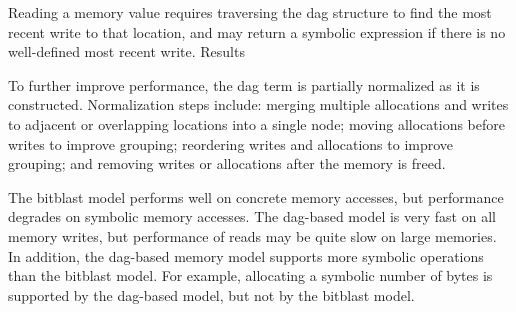 \documentclass{article}
\begin{document}
\begin{itemize}
\begin{itemize}
          \end{itemize}
          Reading a memory value requires traversing the dag structure to find the
          most recent write to that location, and may return a symbolic expression
          if there is no well-defined most recent write.  Results

          To further improve performance, the dag term is partially normalized
          as it is constructed.  Normalization steps include: merging multiple
          allocations and writes to adjacent or overlapping locations into a
          single node; moving allocations before writes to improve grouping;
          reordering writes and allocations to improve grouping; and removing
          writes or allocations after the memory is freed.

\end{itemize}

The bitblast model performs well on concrete memory accesses, but performance
degrades on symbolic memory accesses.  The dag-based model is very fast on all
memory writes, but performance of reads may be quite slow on large memories.
In addition, the dag-based memory model supports more symbolic operations than
the bitblast model.  For example, allocating a symbolic number of bytes is
supported by the dag-based model, but not by the bitblast model.
\end{document}
